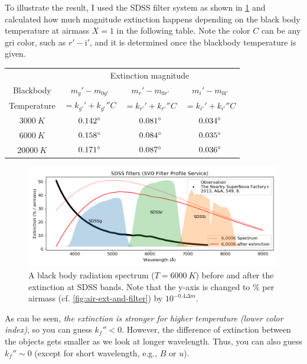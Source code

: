 To illustrate the result, I used the SDSS filter system as shown in \cref{fig:air-ext-bbrad} and calculated how much magnitude extinction happens depending on the black body temperature
at airmass $ X = 1 $ in the following table. Note the color $ C $ can be any gri color, such as $ r'-\mathrm{i}' $, and it is determined once the blackbody temperature is given.

\begin{table}[ht!]
\centering
  \begin{tabular}{c||ccc}
   & \multicolumn{3}{c}{Extinction magnitude} \\
   Blackbody & $ m_g' - m_{0 g'} $ & $ m_r' - m_{0 r'} $ & $ m_i' - m_\mathrm{0 i'} $ \\
  Temperature & $ = k_{g'}' + k_{g'}'' C $ & $ = k_{r'}' + k_{r'}'' C $ & $ = k_{i'}' + k_{i'}'' C $ \\
  \hline
  $ \SI{3000}{K} $  & $ \m{0.142} $ & $ \m{0.081} $ & $ \m{0.034} $ \\
  $ \SI{6000}{K} $  & $ \m{0.158} $ & $ \m{0.084} $ & $ \m{0.035} $ \\
  $ \SI{20000}{K} $ & $ \m{0.171} $ & $ \m{0.087} $ & $ \m{0.036} $ \\
  \end{tabular}
\end{table}

\begin{figure}[ht!]
\centering
\includegraphics[width=0.9\linewidth]{figs/air-ext-bbrad}
\caption{A black body radiation spectrum ($ T = \SI{6000}{K} $) before and after the extinction at SDSS bands. Note that the y-axis is changed to \% per airmass (cf. \cref{fig:air-ext-and-filter}) by $ 10^{-0.4 \Delta m} $.}
\label{fig:air-ext-bbrad}
\end{figure}

As can be seen, \emph{the extinction is stronger for higher temperature (lower color index)}, so you can guess $ k_f'' < 0 $. However, the difference of extinction between the objects gets smaller as we look at longer wavelength. Thus, you can also guess $ k_f'' \sim 0 $ (except for short wavelength, e.g., $ B $ or $ u $).

